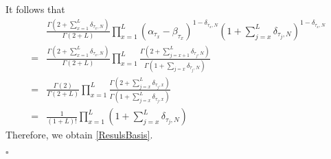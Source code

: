 \documentclass[10pt]{article}
\numberwithin{equation}{section}
\numberwithin{equation}{subsection}
\begin{document}
\begin{comment}
{\color{blue}
\begin{equation}
\begin{split}
\Psi^{''}(\tau_1,\ldots,\tau_L)&=\left[\prod_{x=1}^{L}(\alpha_{\tau_{x}}-\beta_{\tau_{x}})^{(1-\delta_{\tau_{x},N})}\right] \frac{\Gamma\left(2+L-\sum_{x=1}^{L}(1-\delta_{\tau_{x},N})\right)}{\Gamma\left(2+L\right)}\prod_{x=1}^{L} \frac{\Gamma\left(2+L-x-\sum_{j=x+1}^{L}(1-\delta_{\tau_{j},N})\right)}{\Gamma\left(2+L-x-\sum_{j=x}^{L}(1-\delta_{\tau_{j},N})\right)}\\
&=\left[\prod_{x=1}^{L}(\alpha_{\tau_{x}}-\beta_{\tau_{x}})^{(1-\delta_{\tau_{x},N})}\right] \frac{\Gamma\left(2 \right)}{\Gamma\left(2+L\right)}\prod_{x=1}^{L} \frac{\Gamma\left(3+L-x-\sum_{j=x}^{L}(1-\delta_{\tau_{j},N})\right)}{\Gamma\left(2+L-x-\sum_{j=x}^{L}(1-\delta_{\tau_{j},N})\right)}\\
&=\left[\prod_{x=1}^{L}(\alpha_{\tau_{x}}-\beta_{\tau_{x}})^{(1-\delta_{\tau_{x},N})}\right] \frac{\Gamma\left(2 \right)}{\Gamma\left(2+L\right)}\prod_{x=1}^{L} \frac{\Gamma\left(2+\sum_{j=x}^{L}\delta_{\tau_{j},N}\right)}{\Gamma\left(1+\sum_{j=x}^{L}\delta_{\tau_{j},N}\right)}\\
&=  \frac{1}{\left(1+L\right)!}\prod_{x=1}^{L} (\alpha_{\tau_{x}}-\beta_{\tau_{x}})^{(1-\delta_{\tau_{x},N})}\left(1+\sum_{j=x}^{L}\delta_{\tau_{j},N}\right)
\end{split}
\end{equation}}
\end{comment}
It follows that 
\begin{align}\label{remove-exponent}
&\frac{\Gamma(2+\sum_{x=1}^{L}\delta_{\tau_{x},N})}{\Gamma(2+L)}\prod_{x=1}^{L}\left(\alpha_{\tau_{x}}-\beta_{\tau_{x}}\right)^{1-\delta_{\tau_{x},N}}\left(1+\sum_{j=x}^{L}\delta_{\tau_{j},N}\right)^{1-\delta_{\tau_{x},N}}\nonumber\\
=&\frac{\Gamma(2+\sum_{x=1}^{L}\delta_{\tau_{x},N})}{\Gamma(2+L)}\prod_{x=1}^{L}\frac{\Gamma(2+\sum_{j=x+1}^{L}\delta_{\tau_{j},N})}{\Gamma(1+\sum_{j=x}\delta_{\tau_{j},N})}\nonumber\\
=&\frac{\Gamma(2)}{\Gamma(2+L)}\prod_{x=1}^{L}\frac{\Gamma(2+\sum_{j=x}^{L}\delta_{\tau_{j},x})}{\Gamma(1+\sum_{j=x}^{L}\delta_{\tau_{j},x})}\nonumber\\
=&\frac{1}{(1+L)!}\prod_{x=1}^{L}\left(1+\sum_{j=x}^{L}\delta_{\tau_{j},N}\right)
\end{align}
Therefore, we obtain \eqref{ResulsBasis}.
\begin{flushright}
	$\square$
\end{flushright} 
\end{document}
